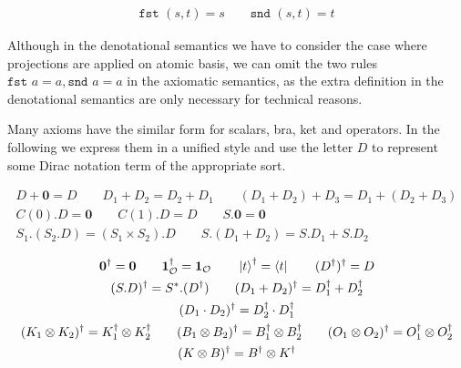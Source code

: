 \documentclass[manuscript, review, timestamp]{acmart}
\newcommand*{\fst}{\texttt{fst }}
\newcommand*{\snd}{\texttt{snd }}
\begin{document}
\begin{definition}[BASIS]
  \begin{gather*}
      \fst (s, t) = s
      \qquad
      \snd (s, t) = t
  \end{gather*}
\end{definition}

Although in the denotational semantics we have to consider the case where projections are applied on atomic basis, we can omit the two rules 
$
\fst a = a,
\snd a = a
$
in the axiomatic semantics, as the extra definition in the denotational semantics are only necessary for technical reasons.



Many axioms have the similar form for scalars, bra, ket and operators. In the following we express them in a unified style and use the letter $D$ to represent some Dirac notation term of the appropriate sort.

\begin{definition}
  \begin{gather*}
    D + \mathbf{0} = D
    \qquad
    D_1 + D_2 = D_2 + D_1
    \qquad
    (D_1 + D_2) + D_3 = D_1 + (D_2 + D_3) \\
    C(0).D = \mathbf{0}
    \qquad
    C(1).D = D
    \qquad
    S.\mathbf{0} = \mathbf{0} \\
    S_1.(S_2.D) = (S_1 \times S_2).D
    \qquad
    S.(D_1 + D_2) = S.D_1 + S.D_2
  \end{gather*}
\end{definition}

\begin{definition}
  \begin{gather*}
    \textbf{0}^\dagger = \textbf{0}
    \qquad
    \mathbf{1}_\mathcal{O}^\dagger = \mathbf{1}_\mathcal{O}
    \qquad
    \ket{t}^\dagger = \bra{t}
    \qquad
    (D^\dagger)^\dagger = D \\
    (S.D)^\dagger = S^*.(D^\dagger)
    \qquad
    (D_1 + D_2)^\dagger = D_1^\dagger + D_2^\dagger \\
    (D_1 \cdot D_2)^\dagger = D_2^\dagger \cdot D_1^\dagger \\
    (K_1 \otimes K_2)^\dagger = K_1^\dagger \otimes K_2^\dagger
    \qquad
    (B_1 \otimes B_2)^\dagger = B_1^\dagger \otimes B_2^\dagger
    \qquad
    (O_1 \otimes O_2)^\dagger = O_1^\dagger \otimes O_2^\dagger \\
    (K \otimes B)^\dagger = B^\dagger \otimes K^\dagger
  \end{gather*}
\end{definition}
\end{document}
